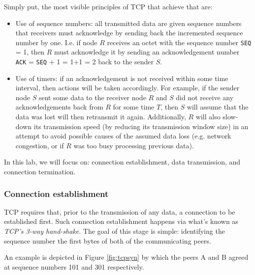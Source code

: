 \documentclass[pdftex,12pt,a4paper]{article}
\begin{document}
            Simply put, the most visible principles of TCP that achieve that
            are:
            \begin{itemize}
                \item Use of sequence numbers: all transmitted data are given
                    sequence numbers that receivers must acknowledge by
                    sending back the incremented sequence number by one.
                    I.e. if node $R$ receives an octet with the sequence number
                    \texttt{SEQ} = 1, then $R$ must acknowledge it by sending an
                    acknowledgement number \texttt{ACK} = \texttt{SEQ} + 1 =
                    1+1 = 2 back to the sender $S$.
                \item Use of timers: if an acknowledgement is not received
                    within some time interval, then actions will be taken
                    accordingly. For example, if the sender node $S$ sent some
                    data to the receiver node $R$ and $S$ did not receive any
                    acknowledgements back from $R$ for some time $T$, then $S$
                    will assume that the data was lost will then retransmit it
                    again. Additionally, $R$ will also slow-down its
                    transmission speed (by reducing its transmission window
                    size) in an attempt to avoid possible causes of the assumed
                    data loss (e.g. network congestion, or if $R$ was too busy
                    processing previous data).
            \end{itemize}

            In this lab, we will focus on: connection establishment, data
            transmission, and connection termination.

            \subsubsection{Connection establishment}
                TCP requires that, prior to the transmission of any data, a
                connection to be established first. Such connection
                establishment happens via what's known as \emph{TCP's 3-way
                hand-shake}. The goal of this stage is simple: identifying the
                sequence number the first bytes of both of the communicating peers.

                An example is depicted in Figure \ref{fig:tcpsyn} by which
                the peers A and B agreed at sequence numbers 101 and 301
                respectively.
\end{document}
